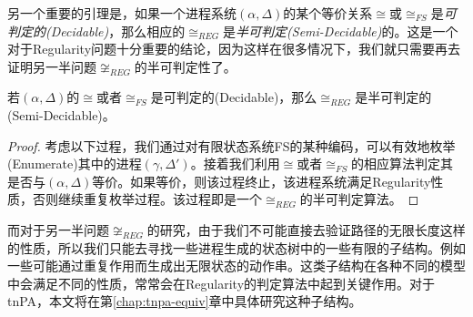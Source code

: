 另一个重要的引理是，如果一个进程系统$(\alpha,\Delta)$的某个等价关系$\cong$或$\cong_{FS}$是\emph{可判定的(Decidable)}，那么相应的$\cong_{REG}$是\emph{半可判定(Semi-Decidable)}的。这是一个对于Regularity问题十分重要的结论，因为这样在很多情况下，我们就只需要再去证明另一半问题$\not\cong_{REG}$的半可判定性了。

\begin{lem}\label{lemma:semi-dec}
若$(\alpha,\Delta)$的$\cong$或者$\cong_{FS}$是可判定的(Decidable)，那么$\cong_{REG}$是半可判定的(Semi-Decidable)。
\end{lem}

\begin{proof}
考虑以下过程，我们通过对有限状态系统FS的某种编码，可以有效地枚举(Enumerate)其中的进程$(\gamma,\Delta')$。接着我们利用$\cong$或者$\cong_{FS}$的相应算法判定其是否与$(\alpha,\Delta)$等价。如果等价，则该过程终止，该进程系统满足Regularity性质，否则继续重复枚举过程。该过程即是一个$\cong_{REG}$的半可判定算法。
\end{proof}

而对于另一半问题$\not\cong_{REG}$的研究，由于我们不可能直接去验证路径的无限长度这样的性质，所以我们只能去寻找一些进程生成的状态树中的一些有限的子结构。例如一些可能通过重复作用而生成出无限状态的动作串。这类子结构在各种不同的模型中会满足不同的性质，常常会在Regularity的判定算法中起到关键作用。对于tnPA，本文将在第\ref{chap:tnpa-equiv}章中具体研究这种子结构。
